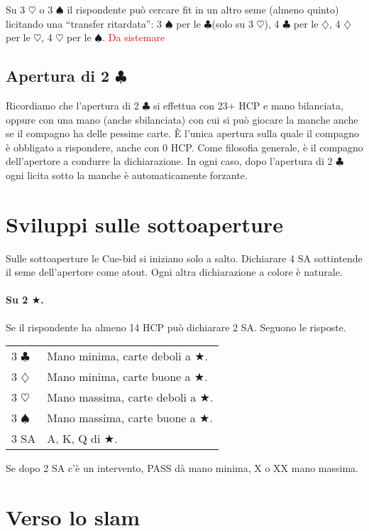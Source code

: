 \documentclass[a4paper,10pt]{article}
\renewcommand{\c}{$\clubsuit$\xspace}
\renewcommand{\d}{$\diamondsuit$\xspace}
\newcommand{\h}{$\heartsuit$\xspace}
\newcommand{\s}{$\spadesuit$\xspace}
\renewcommand{\j}{$\bigstar$\xspace}
\newcommand{\sa}{SA\xspace}
\newcommand{\smallspace}{\vskip0.3cm}
\newcommand{\note}[1]{\textcolor{red}{#1}}
\newenvironment{twocol}
  {\smallspace\noindent\begin{tabular}{l p{0.78\textwidth}}}
  {\end{tabular}\smallspace}
\begin{document}
Su 3 \h o 3 \s il rispondente può cercare fit in un altro seme (almeno quinto) licitando una ``transfer ritardata'': 3 \s per le \c (solo su 3 \h), 4 \c per le \d, 4 \d per le \h, 4 \h per le \s. \note{Da sistemare}


\subsection{Apertura di 2 \c}

Ricordiamo che l'apertura di 2 \c si effettua con 23+ HCP e mano bilanciata, oppure con una mano (anche sbilanciata) con cui si può giocare la manche anche se il compagno ha delle pessime carte.
È l'unica apertura sulla quale il compagno è obbligato a rispondere, anche con 0 HCP.
Come filosofia generale, è il compagno dell'apertore a condurre la dichiarazione.
In ogni caso, dopo l'apertura di 2 \c ogni licita sotto la manche è automaticamente forzante.


\pagebreak

\section{Sviluppi sulle sottoaperture}

Sulle sottoaperture le Cue-bid si iniziano solo a salto. Dichiarare 4 \sa sottintende il seme dell'apertore come atout. Ogni altra dichiarazione a colore è naturale.

\paragraph{Su 2 \j.} Se il rispondente ha almeno 14 HCP può dichiarare 2 \sa. Seguono le risposte.
\begin{twocol}
 3 \c & Mano minima, carte deboli a \j.\\
 3 \d & Mano minima, carte buone a \j.\\
 3 \h & Mano massima, carte deboli a \j.\\
 3 \s & Mano massima, carte buone a \j.\\
 3 \sa & A, K, Q di \j.
\end{twocol}

\noindent Se dopo 2 \sa c'è un intervento, PASS dà mano minima, X o XX mano massima.

\pagebreak

\section{Verso lo slam}
\end{document}
